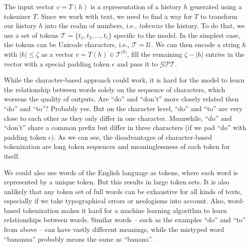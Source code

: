 The input vector $v=T(h)$ is a representation of a history $h$ generated using a tokenizer $T$.
Since we work with text, we need to find a way for $T$ to transform our history $h$ into the realm of numbers, i.e., \emph{tokenize} the history.
To do that, we use a set of tokens $\mathcal{T} = \{ t_1, t_2, \dots, t_\ell \}$ specific to the model.
In the simplest case, the tokens can be Unicode characters, i.e., $\mathcal{T} = \mathcal{U}$.
We can then encode a string $h$ with $|h| \leq \zeta$ as a vector $v = T(h) \in \mathcal{T}^{|h|}$, fill the remaining $\zeta - |h|$ entries in the vector with a special padding token $\epsilon$ and pass it to $\mathcal{GPT}$.
  
While the character-based approach could work, it is hard for the model to learn the relationship between words solely on the sequence of characters, which worsens the quality of outputs.
Are ``do'' and ``don't'' more closely related then ``do'' and ``to''?
Probably yes.
But on the character level, ``do'' and ``to'' are very close to each other as they only differ in one character.
Meanwhile, ``do'' and ``don't'' share a common prefix but differ in three characters (if we pad ``do'' with padding token $\epsilon$).
As we can see, the disadvantages of character-based tokenization are long token sequences and meaninglessness of each token for itself.

We could also use words of the English language as tokens, where each word is represented by a unique token.
But this results in large token sets.
It is also unlikely that any token set of full words can be exhaustive for all kinds of texts, especially if we take typographical errors or neologisms into account.
Also, word-based tokenization makes it hard for a machine learning algorithm to learn relationships between words.
Similar words -- such as the examples ``do'' and ``to'' from above -- can have vastly different meanings, while the mistyped word ``bananna'' probably means the same as ``banana''.


